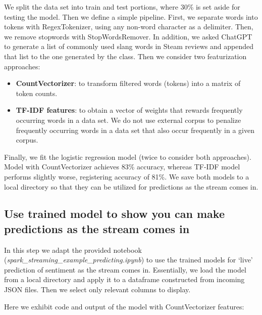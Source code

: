\documentclass[11pt, oneside]{article}   	%
\begin{document}
		We split the data set into train and test portions, where 30\% is set aside for testing the model. Then we define a simple pipeline. 
		First, we separate words into tokens with RegexTokenizer, using any non-word character as a delimiter. Then, we remove stopwords with StopWordsRemover. In addition, we asked ChatGPT to generate a list of commonly used slang words in Steam reviews and appended that list to the one generated by the class. Then we consider two featurization approaches:
		
		\begin{itemize}
		\item \textbf{CountVectorizer}: to transform filtered words (tokens) into a matrix of token counts.
		\item \textbf{TF-IDF features}: to obtain a vector of weights that rewards frequently occurring words in a data set. We do not use external corpus to penalize frequently occurring words in a data set that also occur frequently in a given corpus.
		\end{itemize}
		
		\noindent Finally, we fit the logistic regression model (twice to consider both approaches).
		Model with CountVectorizer achieves 83\% accuracy, whereas TF-IDF model performs slightly worse, registering accuracy of 81\%.
		We save both models to a local directory so that they can be utilized for predictions as the stream comes in.
	
		
		\subsection{Use trained model to show you can make predictions as the stream comes in}
		In this step we adapt the provided notebook (\textit{spark\_streaming\_example\_predicting.ipynb}) to use the trained models for ‘live’ prediction of sentiment as the stream comes in. Essentially, we load the model from a local directory and apply it to a dataframe constructed from incoming JSON files. Then we select only relevant columns to display. 
		\vspace{11pt}
	
		\noindent Here we exhibit code and output of the model with CountVectorizer features:
		\vspace{11pt}
		
\end{document}
